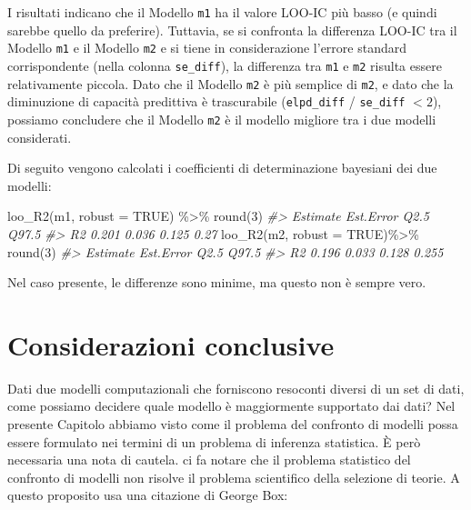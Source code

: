 \documentclass[
  10pt,
  italian,
  a4paper,
  extrafontsizes,onecolumn,openright
  ]{memoir}
\newenvironment{Shaded}{\begin{snugshade}}{\end{snugshade}}
\newcommand{\AttributeTok}[1]{\textcolor[rgb]{0.77,0.63,0.00}{#1}}
\newcommand{\CommentTok}[1]{\textcolor[rgb]{0.56,0.35,0.01}{\textit{#1}}}
\newcommand{\ConstantTok}[1]{\textcolor[rgb]{0.00,0.00,0.00}{#1}}
\newcommand{\DecValTok}[1]{\textcolor[rgb]{0.00,0.00,0.81}{#1}}
\newcommand{\FunctionTok}[1]{\textcolor[rgb]{0.00,0.00,0.00}{#1}}
\newcommand{\NormalTok}[1]{#1}
\newcommand{\SpecialCharTok}[1]{\textcolor[rgb]{0.00,0.00,0.00}{#1}}
\theoremstyle{definition}
\theoremstyle{definition}
\theoremstyle{definition}
\theoremstyle{definition}
\theoremstyle{remark}
\begin{document}
I risultati indicano che il Modello \texttt{m1} ha il valore LOO-IC più basso (e quindi sarebbe quello da preferire). Tuttavia, se si confronta la differenza LOO-IC tra il Modello \texttt{m1} e il Modello \texttt{m2} e si tiene in considerazione l'errore standard corrispondente (nella colonna \texttt{se\_diff}), la differenza tra \texttt{m1} e \texttt{m2} risulta essere relativamente piccola. Dato che il Modello \texttt{m2} è più semplice di \texttt{m2}, e dato che la diminuzione di capacità predittiva è trascurabile (\texttt{elpd\_diff} / \texttt{se\_diff} \(< 2\)), possiamo concludere che il Modello \texttt{m2} è il modello migliore tra i due modelli considerati.

Di seguito vengono calcolati i coefficienti di determinazione bayesiani dei due modelli:

\begin{Shaded}
\begin{Highlighting}[]
\FunctionTok{loo\_R2}\NormalTok{(m1, }\AttributeTok{robust =} \ConstantTok{TRUE}\NormalTok{) }\SpecialCharTok{\%\textgreater{}\%}
  \FunctionTok{round}\NormalTok{(}\DecValTok{3}\NormalTok{)}
\CommentTok{\#\textgreater{}    Estimate Est.Error  Q2.5 Q97.5}
\CommentTok{\#\textgreater{} R2    0.201     0.036 0.125  0.27}
\FunctionTok{loo\_R2}\NormalTok{(m2, }\AttributeTok{robust =} \ConstantTok{TRUE}\NormalTok{)}\SpecialCharTok{\%\textgreater{}\%}
  \FunctionTok{round}\NormalTok{(}\DecValTok{3}\NormalTok{)}
\CommentTok{\#\textgreater{}    Estimate Est.Error  Q2.5 Q97.5}
\CommentTok{\#\textgreater{} R2    0.196     0.033 0.128 0.255}
\end{Highlighting}
\end{Shaded}

\noindent
Nel caso presente, le differenze sono minime, ma questo non è sempre vero.

\hypertarget{considerazioni-conclusive}{%
\section*{Considerazioni conclusive}\label{considerazioni-conclusive}}

Dati due modelli computazionali che forniscono resoconti diversi di un set di dati, come possiamo decidere quale modello è maggiormente supportato dai dati? Nel presente Capitolo abbiamo visto come il problema del confronto di modelli possa essere formulato nei termini di un problema di inferenza statistica. È però necessaria una nota di cautela. \textcite{navarro2019between} ci fa notare che il problema statistico del confronto di modelli non risolve il problema scientifico della selezione di teorie. A questo proposito usa una citazione di George Box:
\end{document}
